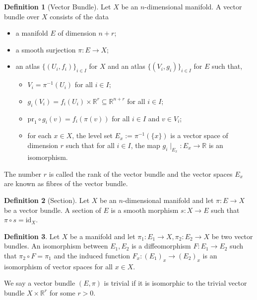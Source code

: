 \documentclass[]{article}
\theoremstyle{definition}
\theoremstyle{definition}
\newtheorem{definition}{Definition}[section]
\begin{document}
\begin{definition}[Vector Bundle]
  Let \(X\) be an \(n\)-dimensional manifold. A vector bundle over \(X\) consists 
  of the data 
  \begin{itemize}
    \item a manifold \(E\) of dimension \(n + r\);
    \item a smooth surjection \(\pi : E \to X\);
    \item an atlas \(\{(U_i, f_i)\}_{i \in I}\) for \(X\) and an atlas 
      \(\{(V_i, g_i)\}_{i \in I}\) for \(E\) such that, 
      \begin{itemize}
        \item \(V_i = \pi^{-1}(U_i)\) for all \(i \in I\);
        \item \(g_i(V_i) = f_i(U_i) \times \mathbb{R}^r \subseteq 
          \mathbb{R}^{n + r}\) for all \(i \in I\);
        \item \(\text{pr}_1 \circ g_i(v) = f_i(\pi(v))\) for all \(i \in I\) and 
          \(v \in V_i\);
        \item for each \(x \in X\), the level set \(E_x := \pi^{-1}(\{x\})\) is 
          a vector space of dimension \(r\) such that for all \(i \in I\), the map 
          \(g_i \mid_{E_x} : E_x \to \mathbb{R}\) is an isomorphism.
      \end{itemize}
  \end{itemize}
  The number \(r\) is called the rank of the vector bundle and the vector spaces 
  \(E_x\) are known as fibres of the vector bundle.
\end{definition}

\begin{definition}[Section]
  Let \(X\) be an \(n\)-dimensional manifold and let \(\pi : E \to X\) be a 
  vector bundle. A section of \(E\) is a smooth morphism \(s : X \to E\) such 
  that \(\pi \circ s = \text{id}_X\).
\end{definition}

\begin{definition}
  Let \(X\) be a manifold and let \(\pi_1 : E_1 \to X, \pi_2 : E_2 \to X\) be 
  two vector bundles. An isomorphism between \(E_1, E_2\) is a diffeomorphism 
  \(F : E_1 \to E_2\) such that \(\pi_2 \circ F = \pi_1\) and the induced 
  function \(F_x : (E_1)_x \to (E_2)_x\) is an isomorphism of vector spaces 
  for all \(x \in X\).
\end{definition}

We say a vector bundle \((E, \pi)\) is trivial if it is isomorphic to the 
trivial vector bundle \(X \times \mathbb{R}^r\) for some \(r > 0\).
\end{document}
